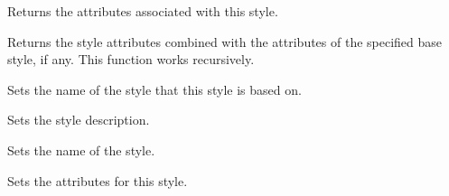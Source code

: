 

Returns the attributes associated with this style.

\label{wxrichtextstyledefinitiongetstylemergedwithbase}


Returns the style attributes combined with the attributes of the specified base style, if any. This function works recursively.

\label{wxrichtextstyledefinitionsetbasestyle}


Sets the name of the style that this style is based on.

\label{wxrichtextstyledefinitionsetdescription}


Sets the style description.

\label{wxrichtextstyledefinitionsetname}


Sets the name of the style.

\label{wxrichtextstyledefinitionsetstyle}


Sets the attributes for this style.


